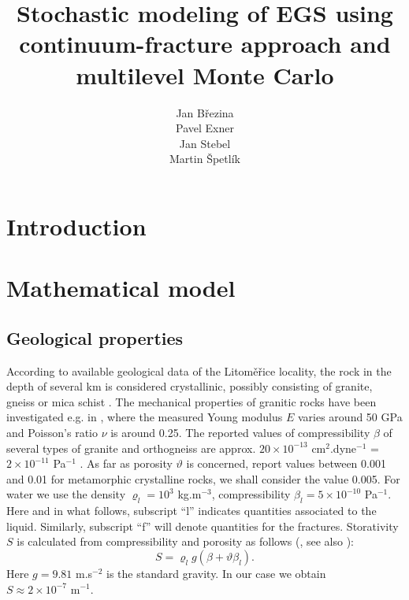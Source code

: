 \documentclass{article}
\title{Stochastic modeling of EGS using continuum-fracture approach and multilevel Monte Carlo}
\author{
  Jan Březina \\
  \And
  Pavel Exner \\
  \And
  Jan Stebel \\
  \And
  Martin Špetlík \\
}
\begin{document}
\maketitle

\begin{abstract}

\end{abstract}




\section{Introduction}



\section{Mathematical model}

\subsection{Geological properties}

According to available geological data of the Litoměřice locality, the rock in the depth of several km is considered crystallinic, possibly consisting of granite, gneiss or mica schist \cite{capova}. %
The mechanical properties of granitic rocks have been investigated e.g. in \cite{ljunggren}, where the measured Young modulus $E$ varies around 50 GPa and Poisson's ratio $\nu$ is around 0.25.
The reported values of compressibility $\beta$ of several types of granite and orthogneiss are approx. $20\times 10^{-13}$ cm${}^2$.dyne${}^{-1}$ = $2\times10^{-11}$ Pa${}^{-1}$ \cite{zisman}.
As far as porosity $\vartheta$ is concerned, \cite{intera} report values between 0.001 and 0.01 for metamorphic crystalline rocks, we shall consider the value 0.005.
For water we use the density $\varrho_l=10^3$ kg.m${}^{-3}$, compressibility $\beta_l=5\times 10^{-10}$ Pa${}^{-1}$.
Here and in what follows, subscript ``l'' indicates quantities associated to the liquid.
Similarly, subscript ``f'' will denote quantities for the fractures.
Storativity $S$ is calculated from compressibility and porosity as follows (\cite{brace-et-al}, see also \cite{intera}):
\[ S = \varrho_l g(\beta + \vartheta\beta_l). \]
Here $g=9.81$ m.s${}^{-2}$ is the standard gravity.
In our case we obtain $S\approx 2\times 10^{-7} \mbox{ m}^{-1}$.
\end{document}
